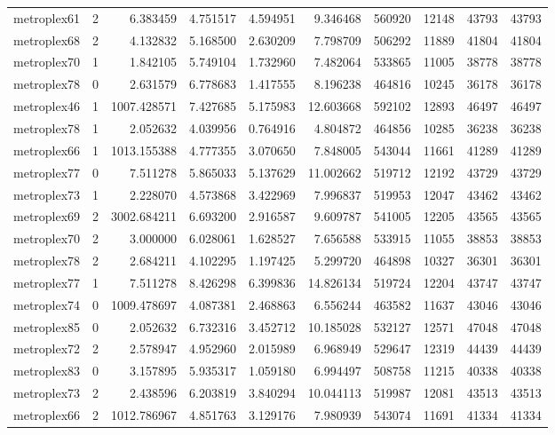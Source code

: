 \begin{longtable}{|l|r|r|r|r|r|r|r|r|r|}
metroplex61 & 2 & 6.383459 & 4.751517 & 4.594951 & 9.346468 & 560920 & 12148 & 43793 & 43793 \\
metroplex68 & 2 & 4.132832 & 5.168500 & 2.630209 & 7.798709 & 506292 & 11889 & 41804 & 41804 \\
metroplex70 & 1 & 1.842105 & 5.749104 & 1.732960 & 7.482064 & 533865 & 11005 & 38778 & 38778 \\
metroplex78 & 0 & 2.631579 & 6.778683 & 1.417555 & 8.196238 & 464816 & 10245 & 36178 & 36178 \\
metroplex46 & 1 & 1007.428571 & 7.427685 & 5.175983 & 12.603668 & 592102 & 12893 & 46497 & 46497 \\
metroplex78 & 1 & 2.052632 & 4.039956 & 0.764916 & 4.804872 & 464856 & 10285 & 36238 & 36238 \\
metroplex66 & 1 & 1013.155388 & 4.777355 & 3.070650 & 7.848005 & 543044 & 11661 & 41289 & 41289 \\
metroplex77 & 0 & 7.511278 & 5.865033 & 5.137629 & 11.002662 & 519712 & 12192 & 43729 & 43729 \\
metroplex73 & 1 & 2.228070 & 4.573868 & 3.422969 & 7.996837 & 519953 & 12047 & 43462 & 43462 \\
metroplex69 & 2 & 3002.684211 & 6.693200 & 2.916587 & 9.609787 & 541005 & 12205 & 43565 & 43565 \\
metroplex70 & 2 & 3.000000 & 6.028061 & 1.628527 & 7.656588 & 533915 & 11055 & 38853 & 38853 \\
metroplex78 & 2 & 2.684211 & 4.102295 & 1.197425 & 5.299720 & 464898 & 10327 & 36301 & 36301 \\
metroplex77 & 1 & 7.511278 & 8.426298 & 6.399836 & 14.826134 & 519724 & 12204 & 43747 & 43747 \\
metroplex74 & 0 & 1009.478697 & 4.087381 & 2.468863 & 6.556244 & 463582 & 11637 & 43046 & 43046 \\
metroplex85 & 0 & 2.052632 & 6.732316 & 3.452712 & 10.185028 & 532127 & 12571 & 47048 & 47048 \\
metroplex72 & 2 & 2.578947 & 4.952960 & 2.015989 & 6.968949 & 529647 & 12319 & 44439 & 44439 \\
metroplex83 & 0 & 3.157895 & 5.935317 & 1.059180 & 6.994497 & 508758 & 11215 & 40338 & 40338 \\
metroplex73 & 2 & 2.438596 & 6.203819 & 3.840294 & 10.044113 & 519987 & 12081 & 43513 & 43513 \\
metroplex66 & 2 & 1012.786967 & 4.851763 & 3.129176 & 7.980939 & 543074 & 11691 & 41334 & 41334 \\

\end{longtable}
